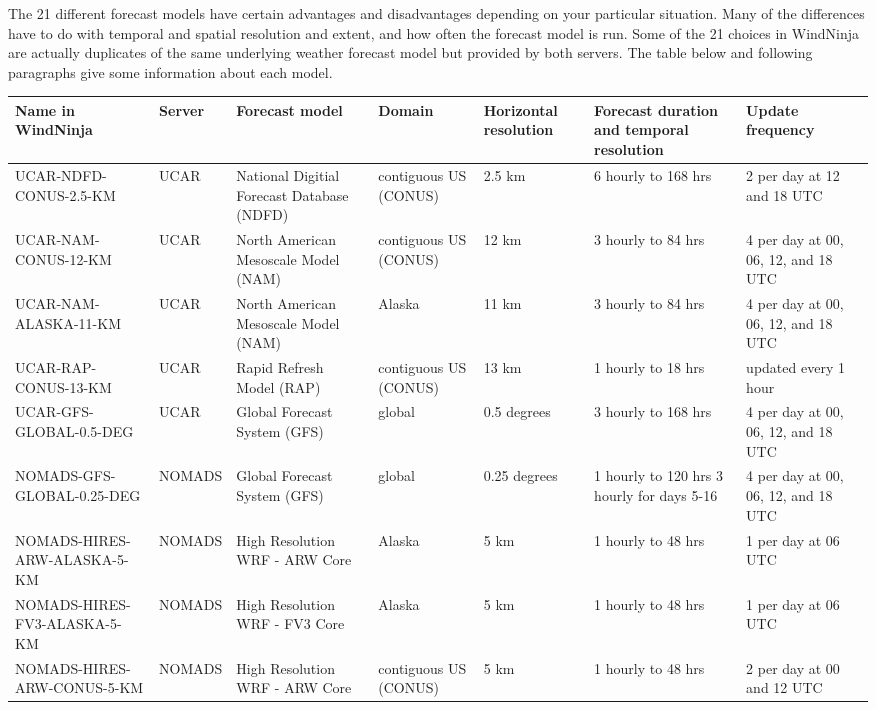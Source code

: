 \documentclass[12pt]{article}
\begin{document}
The 21 different forecast models have certain advantages and disadvantages depending on your particular situation.  Many of the differences have to do with temporal and spatial resolution and extent, and how often the forecast model is run.  Some of the 21 choices in WindNinja are actually duplicates of the same underlying weather forecast model but provided by both servers.  The table below and following paragraphs give some information about each model.

\begin{landscape}
\begin{table}
\fontsize{8}{12}\selectfont 
\begin{tabular}{|p{6.6cm}|p{1.3cm}|p{3.3cm}|p{2cm}|p{1.7cm}|p{2.8cm}|p{2.8cm}|}
\hline
\rowcolor{lightgray} Name in WindNinja & Server & Forecast model & Domain & Horizontal resolution & Forecast duration and temporal resolution & Update frequency\\
\hline
UCAR-NDFD-CONUS-2.5-KM & UCAR & National Digitial Forecast Database (NDFD) & contiguous US (CONUS) & 2.5 km & 6 hourly to 168 hrs & 2 per day at 12 and 18 UTC\\
\hline
UCAR-NAM-CONUS-12-KM & UCAR & North American Mesoscale Model (NAM) & contiguous US (CONUS) & 12 km & 3 hourly to 84 hrs & 4 per day at 00, 06, 12, and 18 UTC\\
\hline
UCAR-NAM-ALASKA-11-KM & UCAR & North American Mesoscale Model (NAM) & Alaska & 11 km & 3 hourly to 84 hrs & 4 per day at 00, 06, 12, and 18 UTC\\
\hline
UCAR-RAP-CONUS-13-KM & UCAR & Rapid Refresh Model (RAP) & contiguous US (CONUS) & 13 km & 1 hourly to 18 hrs & updated every 1 hour\\
\hline
UCAR-GFS-GLOBAL-0.5-DEG & UCAR & Global Forecast System (GFS) & global & 0.5 degrees & 3 hourly to 168 hrs & 4 per day at 00, 06, 12, and 18 UTC\\
\hline
NOMADS-GFS-GLOBAL-0.25-DEG & NOMADS & Global Forecast System (GFS) & global & 0.25 degrees & 1 hourly to 120 hrs 3 hourly for days 5-16 & 4 per day at 00, 06, 12, and 18 UTC\\
\hline
NOMADS-HIRES-ARW-ALASKA-5-KM & NOMADS & High Resolution WRF - ARW Core & Alaska & 5 km & 1 hourly to 48 hrs & 1 per day at 06 UTC\\
\hline
NOMADS-HIRES-FV3-ALASKA-5-KM & NOMADS & High Resolution WRF - FV3 Core & Alaska & 5 km & 1 hourly to 48 hrs & 1 per day at 06 UTC\\
\hline
NOMADS-HIRES-ARW-CONUS-5-KM & NOMADS & High Resolution WRF - ARW Core & contiguous US (CONUS) & 5 km & 1 hourly to 48 hrs & 2 per day at 00 and 12 UTC\\

\end{tabular}
\end{table}
\end{landscape}
\end{document}
